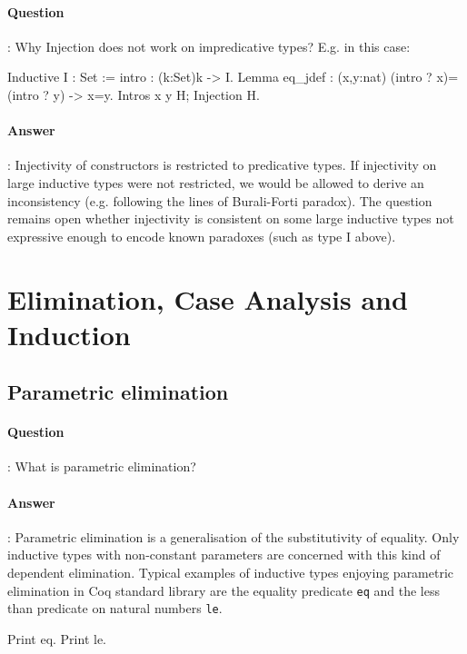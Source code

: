 \documentclass{article}
\begin{document}
\paragraph{Question}: Why Injection does not work on impredicative types? E.g. in this case:

\begin{coq_example*}
  Inductive I : Set := intro : (k:Set)k -> I.
  Lemma eq_jdef : (x,y:nat) (intro ? x)=(intro ? y) -> x=y.
  Intros x y H; Injection H.
\end{coq_example*}

\paragraph{Answer}: Injectivity of constructors is restricted to predicative types. If
injectivity on large inductive types were not restricted, we would be
allowed to derive an inconsistency (e.g. following the lines of
Burali-Forti paradox). The question remains open whether injectivity
is consistent on some large inductive types not expressive enough to
encode known paradoxes (such as type I above).

\section{Elimination, Case Analysis and Induction}

\subsection{Parametric elimination}

\paragraph{Question}: What is parametric elimination?

\paragraph{Answer}: Parametric elimination is a 
generalisation of the substitutivity of equality. Only inductive types
with non-constant parameters are concerned with this kind of dependent
elimination. Typical examples of inductive types enjoying parametric
elimination in Coq standard library are the equality predicate
\verb=eq= and the less than predicate on natural numbers \verb=le=.

\begin{coq_example*}
Print eq.
Print le.
\end{coq_example*}
\end{document}
